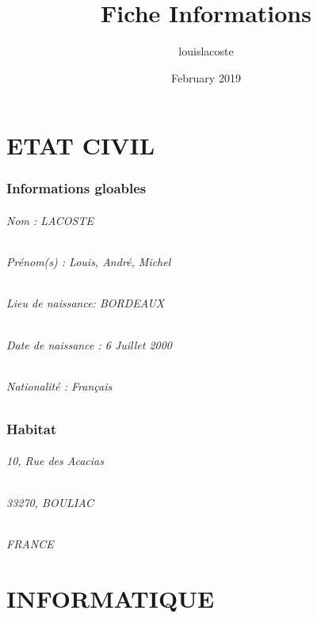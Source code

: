 \documentclass{article}
\title{Fiche Informations}
\author{louislacoste}
\date{February 2019}
\begin{document}
\maketitle

\clearpage

\part{ETAT CIVIL}

\section{Informations gloables}

\paragraph{Nom : LACOSTE}
\paragraph{Prénom(s) : Louis, André, Michel}
\paragraph{Lieu de naissance: BORDEAUX}
\paragraph{Date de naissance : 6 Juillet 2000}
\paragraph{Nationalité : Français}

\section{Habitat}

\paragraph{10, Rue des Acacias}
\paragraph{33270, BOULIAC}
\paragraph{FRANCE}

\clearpage
\part{INFORMATIQUE}
\setcounter{section}{0}
\end{document}
